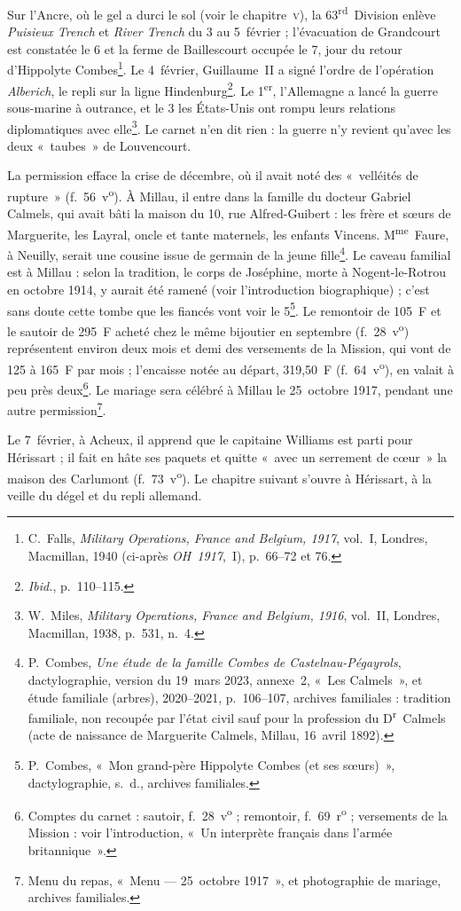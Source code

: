Sur l'Ancre, où le gel a durci le sol (voir le chapitre~\textsc{v}), la 63\textsuperscript{rd}~Division enlève \textit{Puisieux Trench} et \textit{River Trench} du 3 au 5~février ; l'évacuation de Grandcourt est constatée le 6 et la ferme de Baillescourt occupée le 7, jour du retour d'Hippolyte Combes\footnote{C.~Falls, \textit{Military Operations, France and Belgium, 1917}, vol.~I, Londres, Macmillan, 1940 (ci-après \textit{OH~1917},~I), p.~66--72 et 76.}. Le 4~février, Guillaume~II a signé l'ordre de l'opération \textit{Alberich}, le repli sur la ligne Hindenburg\footnote{\textit{Ibid.}, p.~110--115.}. Le 1\textsuperscript{er}, l'Allemagne a lancé la guerre sous-marine à outrance, et le 3 les États-Unis ont rompu leurs relations diplomatiques avec elle\footnote{W.~Miles, \textit{Military Operations, France and Belgium, 1916}, vol.~II, Londres, Macmillan, 1938, p.~531, n.~4.}. Le carnet n'en dit rien : la guerre n'y revient qu'avec les deux «~taubes~» de Louvencourt.

La permission efface la crise de décembre, où il avait noté des «~velléités de rupture~» (f.~56~v\textsuperscript{o}). À Millau, il entre dans la famille du docteur Gabriel Calmels, qui avait bâti la maison du 10, rue Alfred-Guibert : les frère et sœurs de Marguerite, les Layral, oncle et tante maternels, les enfants Vincens. M\textsuperscript{me}~Faure, à Neuilly, serait une cousine issue de germain de la jeune fille\footnote{P.~Combes, \textit{Une étude de la famille Combes de Castelnau-Pégayrols}, dactylographie, version du 19~mars 2023, annexe~2, «~Les Calmels~», et étude familiale (arbres), 2020--2021, p.~106--107, archives familiales : tradition familiale, non recoupée par l'état civil sauf pour la profession du D\textsuperscript{r}~Calmels (acte de naissance de Marguerite Calmels, Millau, 16~avril 1892).}. Le caveau familial est à Millau : selon la tradition, le corps de Joséphine, morte à Nogent-le-Rotrou en octobre 1914, y aurait été ramené (voir l'introduction biographique) ; c'est sans doute cette tombe que les fiancés vont voir le 5\footnote{P.~Combes, «~Mon grand-père Hippolyte Combes (et ses sœurs)~», dactylographie, s.~d., archives familiales.}. Le remontoir de 105~F et le sautoir de 295~F acheté chez le même bijoutier en septembre (f.~28~v\textsuperscript{o}) représentent environ deux mois et demi des versements de la Mission, qui vont de 125 à 165~F par mois ; l'encaisse notée au départ, 319,50~F (f.~64~v\textsuperscript{o}), en valait à peu près deux\footnote{Comptes du carnet : sautoir, f.~28~v\textsuperscript{o} ; remontoir, f.~69~r\textsuperscript{o} ; versements de la Mission : voir l'introduction, «~Un interprète français dans l'armée britannique~».}. Le mariage sera célébré à Millau le 25~octobre 1917, pendant une autre permission\footnote{Menu du repas, «~Menu --- 25~octobre 1917~», et photographie de mariage, archives familiales.}.

Le 7~février, à Acheux, il apprend que le capitaine Williams est parti pour Hérissart ; il fait en hâte ses paquets et quitte «~avec un serrement de cœur~» la maison des Carlumont (f.~73~v\textsuperscript{o}). Le chapitre suivant s'ouvre à Hérissart, à la veille du dégel et du repli allemand.
